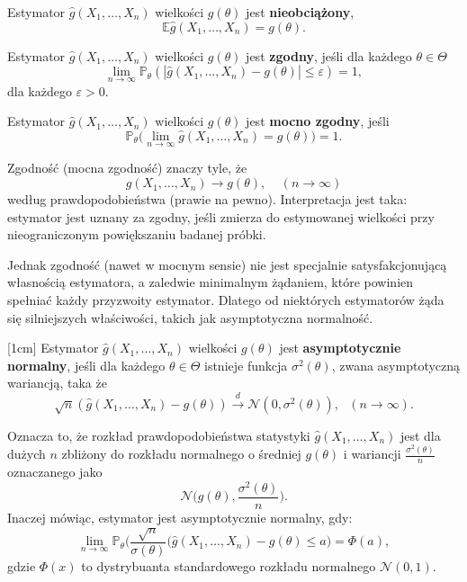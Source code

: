\begin{definition}
Estymator $\hat{g}(X_1, \dots , X_n)$ wielkości $g(\theta)$ jest \textbf{nieobciążony},  
$$\mathbb{E}\hat{g}(X_1, \dots , X_n) = g(\theta).$$

\end{definition}

\begin{definition}
Estymator $\hat{g}(X_1, \dots , X_n)$ wielkości $g(\theta)$ jest \textbf{zgodny},
jeśli dla każdego $\theta \in \Theta$
$$ \lim\limits_{n \rightarrow \infty} \mathbb{P}_{\theta}(|\hat{g}(X_1,\dots,X_n) -g(\theta)| \leq \varepsilon ) = 1,$$
dla każdego $\varepsilon > 0.$
\end{definition}

\begin{definition}
Estymator $\hat{g}(X_1, \dots , X_n)$ wielkości $g(\theta)$ jest \textbf{mocno zgodny},
jeśli %
$$\mathbb{P}_{\theta}\Big(\lim\limits_{n \rightarrow \infty}\hat{g}(X_1,\dots,X_n)=g(\theta) \Big) = 1.$$
\end{definition}


Zgodność (mocna zgodność) znaczy tyle, że
$$\hat{g}(X_1, \dots , X_n) \rightarrow g(\theta), \ \ \ \ \ (n \rightarrow \infty)$$
według prawdopodobieństwa (prawie na pewno). Interpretacja jest taka: estymator jest uznany za
zgodny, jeśli zmierza do estymowanej wielkości przy nieograniczonym powiększaniu badanej próbki.

Jednak zgodność (nawet w mocnym sensie) nie jest specjalnie satysfakcjonującą własnością estymatora,
a zaledwie minimalnym żądaniem, które powinien spełniać każdy przyzwoity estymator. Dlatego od niektórych estymatorów żąda się silniejszych właściwości, takich jak asymptotyczna normalność.

\begin{definition}
[1cm]
Estymator $\hat{g}(X_1, \dots , X_n)$ wielkości $g(\theta)$ jest \textbf{asymptotycznie normalny}, jeśli dla każdego $\theta \in \Theta$ istnieje funkcja $\sigma^2(\theta)$, zwana asymptotyczną wariancją, taka że
$$\sqrt{n}(\hat{g}(X_1,\dots,X_n) -g(\theta))  \overset{d}{\rightarrow} \mathcal{N}(0, \sigma^2(\theta)), \ \ \ (n \rightarrow \infty).$$
\end{definition}


Oznacza to, że rozkład prawdopodobieństwa statystyki $\hat{g}(X_1,\dots,X_n)$ jest dla dużych $n$ zbliżony do rozkładu normalnego o średniej $g(\theta)$ i wariancji $\frac{\sigma^2(\theta)}{n}$ oznaczanego jako $$\mathcal{N}\Big(g(\theta), \dfrac{\sigma^2(\theta)}{n}\Big).$$ Inaczej mówiąc, estymator jest asymptotycznie normalny, gdy: 
$$\lim\limits_{n \rightarrow \infty} \mathbb{P}_{\theta} \Big(\dfrac{\sqrt{n}}{\sigma(\theta)}(\hat{g}(X_1,\dots,X_n) -g(\theta) \leq a \Big) = \Phi(a),$$
gdzie $\Phi(x)$ to dystrybuanta standardowego rozkładu normalnego $\mathcal{N}(0,1)$.

